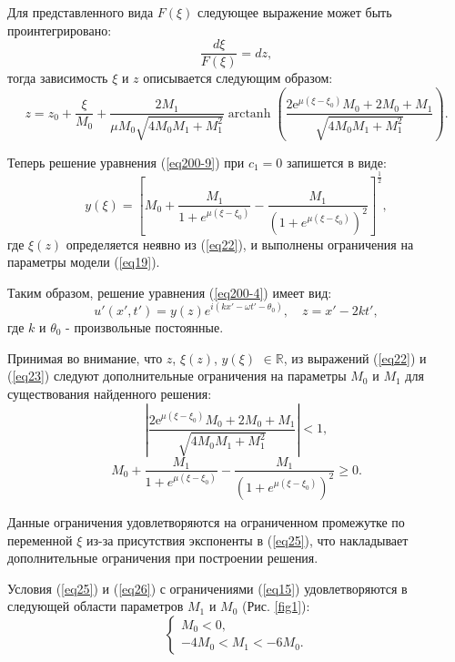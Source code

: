 \documentclass[12pt,a4paper]{article}
\DeclareMathOperator\arctanh{arctanh}
\begin{document}
	Для представленного вида \(F(\xi)\) следующее выражение может быть проинтегрировано:
	\begin{equation}
		\frac{d \xi}{F(\xi)}=dz,
	\end{equation}
	тогда зависимость \(\xi\) и \(z\) описывается следующим образом:
	\begin{equation} \label{eq22}
		z=z_{0}+\frac{\xi}{M_{0}}+\frac{2 M_{1}}{\mu M_{0} \sqrt{4 M_{0} M_{1}+M_{1}^{2}}} \arctanh \left(\frac{2 {\mathrm e}^{\mu (\xi-\xi_{0})} M_{0}+2 M_{0}+M_{1}}{\sqrt{4 M_{0} M_{1}+M_{1}^{2}}}\right).
	\end{equation}

	Теперь решение уравнения (\ref{eq200-9}) при \(c_{1}=0\) запишется в виде:
	\begin{equation}\label{eq23}
		y(\xi)=\left[ M_{0}+\frac{M_{1}}{1+e^{\mu(\xi-\xi_{0})}}-\frac{M_{1}}{\left(1+e^{\mu\left(\xi-\xi_{0}\right)}\right)^{2}}\right]^{\frac{1}{2}},
	\end{equation}
	где \(\xi(z)\) определяется неявно из (\ref{eq22}), и выполнены ограничения на параметры модели (\ref{eq19}).

	Таким образом, решение уравнения (\ref{eq200-4}) имеет вид:
	\begin{equation}\label{eq24}
		u'(x',t')=y(z)e^{i(kx'-\omega t'-\theta_{0})}, \quad z=x'-2kt',
	\end{equation}
	где \(k\) и \(\theta_{0}\) - произвольные постоянные. 

	Принимая во внимание, что \(z\), \(\xi (z)\), \(y(\xi)\) \(\in \mathbb{R}\), из выражений (\ref{eq22}) и (\ref{eq23}) следуют дополнительные ограничения на параметры \(M_{0}\) и \(M_{1}\) для существования найденного решения:
	\begin{equation} \label{eq25}
		\left|\frac{2 {\mathrm e}^{\mu (\xi-\xi_{0})} M_{0}+2 M_{0}+M_{1}}{\sqrt{4 M_{0} M_{1}+M_{1}^{2}}}\right|< 1,
	\end{equation}
	\begin{equation} \label{eq26}
		M_{0}+\frac{M_{1}}{1+e^{\mu(\xi-\xi_{0})}}-\frac{M_{1}}{\left(1+e^{\mu(\xi-\xi_{0})}\right)^{2}}\ge 0.
	\end{equation}

	Данные ограничения удовлетворяются на ограниченном промежутке по переменной \(\xi\) из-за присутствия экспоненты в (\ref{eq25}), что накладывает дополнительные ограничения при построении решения.

	Условия (\ref{eq25}) и (\ref{eq26}) с ограничениями (\ref{eq15}) удовлетворяются в следующей области параметров \(M_{1}\) и \( M_{0}\) (Рис. \ref{fig1}):
	\begin{equation} \label{eq27}
		\begin{cases}
			M_{0}<0,\\
			-4 M_{0} < M_{1} < -6 M_{0}.
		\end{cases}
	\end{equation}
\end{document}
